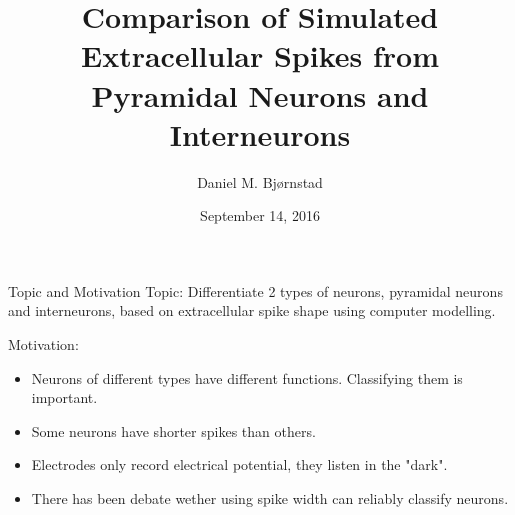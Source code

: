 \documentclass[aspectratio=169]{beamer}
\title[Short title] %
{
    Comparison of Simulated Extracellular Spikes from Pyramidal Neurons and Interneurons
}
\author %
{Daniel M. Bj\o rnstad}
\date{September 14, 2016}
\institute
{
    Master Thesis Presentation
}
\begin{document}
\begin{frame}
  \titlepage
\end{frame}






%   
%   
%

\begin{frame}{Topic and Motivation}
    Topic: Differentiate 2 types of neurons, pyramidal neurons and interneurons, 
    based on extracellular spike shape using computer modelling.
    \newline

    Motivation: 
    \begin{itemize}
        \item Neurons of different types have different functions. Classifying them is important.
        \item Some neurons have shorter spikes than others. 
        \item Electrodes only record electrical potential, they listen in the "dark".
        \item There has been debate wether using spike width can reliably classify neurons. 
    \end{itemize}
\end{frame}
\end{document}
